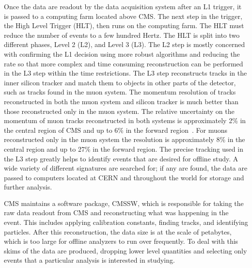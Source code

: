 Once the data are readout by the data acquisition system after an L1 trigger, it is passed to a computing farm located above CMS.
The next step in the trigger, the High Level Trigger (HLT), then runs on the computing farm.
The HLT must reduce the number of events to a few hundred Hertz.
The HLT is split into two different
phases, Level 2 (L2), and Level 3 (L3). The L2 step is mostly concerned with confirming the L1 decision using more robust algorithms
and reducing the rate so that more complex and time consuming reconstruction can be performed in the L3 step within the time restrictions.
The L3 step reconstructs tracks in the inner silicon tracker and match them
to objects in other parts of the detector, such as tracks found in the muon system. The momentum resolution of tracks reconstructed in both the muon system and silicon tracker
is much better than those reconstructed only in the muon system. The relative uncertainty on the momentum of muon tracks reconstructed in both systems is approximately
2\% in the central region of CMS and up to 6\% in the forward region~\cite{2012JInst...7P0002T}. For muons reconstructed only in the muon system the 
resolution is approximately 8\%
in the central region and up to 27\% in the forward region. 
The precise tracking used in the L3 step greatly helps to identify events that are desired for offline study.
A wide variety of different signatures are searched for; if any are found, the data are passed to computers located at CERN
and throughout the world for storage and further analysis.

CMS maintains a software package, CMSSW, which is responsible for taking the raw data readout from CMS and reconstructing what was happening in the event.
This includes applying calibration constants, finding tracks, and identifying particles.
After this reconstruction, the data size is at the scale of petabytes, which is too large for offline analyzers to run over frequently. 
To deal with this skims of the data are produced, dropping lower level quantities and selecting only events that a particular analysis is interested in studying.

